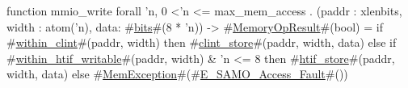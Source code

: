 function mmio_write forall 'n, 0 <'n <= max_mem_access . (paddr : xlenbits, width : atom('n), data: #\hyperref[sailRISCVzbits]{bits}#(8 * 'n)) -> #\hyperref[sailRISCVzMemoryOpResult]{MemoryOpResult}#(bool) =
  if   #\hyperref[sailRISCVzwithinzyclint]{within\_clint}#(paddr, width)
  then #\hyperref[sailRISCVzclintzystore]{clint\_store}#(paddr, width, data)
  else if #\hyperref[sailRISCVzwithinzyhtifzywritable]{within\_htif\_writable}#(paddr, width) & 'n <= 8
  then #\hyperref[sailRISCVzhtifzystore]{htif\_store}#(paddr, width, data)
  else #\hyperref[sailRISCVzMemException]{MemException}#(#\hyperref[sailRISCVzEzySAMOzyAccesszyFault]{E\_SAMO\_Access\_Fault}#())
